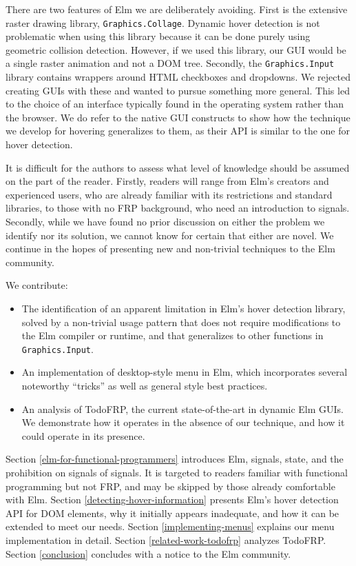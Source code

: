 \documentclass{article}
\begin{document}
There are two features of Elm we are deliberately avoiding. First is the
extensive raster drawing library, \texttt{Graphics.Collage}. Dynamic hover
detection is not problematic when using this library because it can be done
purely using geometric collision detection. However, if we used this library, our
GUI would be a single raster animation and not a DOM tree. Secondly, the
\texttt{Graphics.Input} library contains wrappers around HTML checkboxes and
dropdowns. We rejected creating GUIs with these and wanted to pursue something
more general. This led to the choice of an interface typically found in the
operating system rather than the browser. We do refer to the native GUI
constructs to show how the technique we develop for hovering generalizes to
them, as their API is similar to the one for hover detection.

It is difficult for the authors to assess what level of knowledge should
be assumed on the part of the reader. Firstly, readers will range from
Elm's creators and experienced users, who are already familiar with its
restrictions and standard libraries, to those with no FRP background,
who need an introduction to signals. Secondly, while we have found no
prior discussion on either the problem we identify nor its solution, we
cannot know for certain that either are novel. We continue in the hopes
of presenting new and non-trivial techniques to the Elm community.

We contribute:

\begin{itemize}
\itemsep1pt\parskip0pt
\item
  The identification of an apparent limitation in Elm's hover detection
  library, solved by a non-trivial usage pattern that does not require
  modifications to the Elm compiler or runtime, and that generalizes to
  other functions in \texttt{Graphics.Input}.
\item
  An implementation of desktop-style menu in Elm, which incorporates
  several noteworthy ``tricks'' as well as general style best practices.
\item
  An analysis of TodoFRP, the current state-of-the-art in dynamic Elm
  GUIs. We demonstrate how it operates in the absence of our technique,
  and how it could operate in its presence.
\end{itemize}

Section \ref{elm-for-functional-programmers} introduces Elm, signals, state, and
the prohibition on signals of signals. It is targeted to readers familiar with
functional programming but not FRP, and may be skipped by those already
comfortable with Elm.  Section \ref{detecting-hover-information} presents Elm's
hover detection API for DOM elements, why it initially appears inadequate, and
how it can be extended to meet our needs. Section \ref{implementing-menus}
explains our menu implementation in detail. Section \ref{related-work-todofrp}
analyzes TodoFRP. Section \ref{conclusion} concludes with a notice to the Elm
community.
\end{document}
